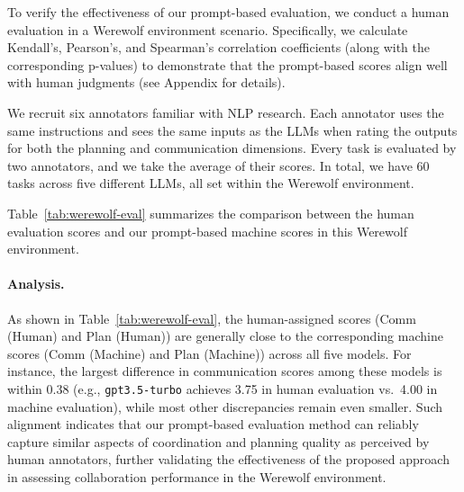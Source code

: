 To verify the effectiveness of our prompt-based evaluation, we conduct a human evaluation in a Werewolf environment scenario. Specifically, we calculate Kendall's, Pearson's, and Spearman's correlation coefficients (along with the corresponding p-values) to demonstrate that the prompt-based scores align well with human judgments (see Appendix for details). 

We recruit six annotators familiar with NLP research. Each annotator uses the same instructions and sees the same inputs as the LLMs when rating the outputs for both the planning and communication dimensions. Every task is evaluated by two annotators, and we take the average of their scores. In total, we have 60 tasks across five different LLMs, all set within the Werewolf environment. 

Table~\ref{tab:werewolf-eval} summarizes the comparison between the human evaluation scores and our prompt-based machine scores in this Werewolf environment.


\begin{table}[htbp]
\centering
{}
\caption{Comparison of human vs.\ machine evaluation scores in a Werewolf scenario.}
\label{tab:werewolf-eval}
\end{table}

\paragraph{Analysis.}
As shown in Table~\ref{tab:werewolf-eval}, the human-assigned scores (Comm (Human) and Plan (Human)) are generally close to the corresponding machine scores (Comm (Machine) and Plan (Machine)) across all five models. For instance, the largest difference in communication scores among these models is within 0.38 (e.g., \texttt{gpt3.5-turbo} achieves 3.75 in human evaluation vs.\ 4.00 in machine evaluation), while most other discrepancies remain even smaller. Such alignment indicates that our prompt-based evaluation method can reliably capture similar aspects of coordination and planning quality as perceived by human annotators, further validating the effectiveness of the proposed approach in assessing collaboration performance in the Werewolf environment.


